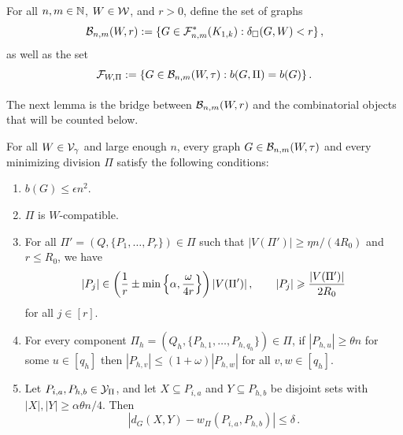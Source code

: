 For all $n,m\in{\mathbb N}$, $W\in{\mathcal W}$, and $r>0$, define the set of graphs
$${\mathcal B}_{n,m}(W,r):=\{G\in{\mathcal F}^\ast_{n,m}(K_{1,k}):\delta_\square(G,W)<r\}\,,$$
as well as the set
\[\arraycolsep=1.4pt
\begin{array}{ll}
\cF_{W,\Pi} &:= \{G\in\cB_{n,m}(W,\tau):b(G,\Pi)=b(G)\}\,. \\[7pt]
\end{array}\]
The next lemma is the bridge between ${\mathcal B}_{n,m}(W,r)$ and the combinatorial objects that will be counted below.

\begin{lemma}\label{lemma:WtoWtildeMetricsK1k}
For all $W\in{\mathcal V}_\gamma$ and large enough $n$, every graph $G\in{\mathcal B}_{n,m}(W,\tau)$ and every minimizing division $\Pi$ satisfy the following conditions:
\begin{enumerate}[
 label=\textit{(\roman*)},
 ref=(\textit{\roman*}),
 topsep=5pt
]
  \item\label{item:bgleqen2} $b(G)\leq \epsilon n^2$.
  \item\label{item:SubCloseK1k-compatible} $\Pi$ is $W$-compatible.
  \item\label{item:SubCloseK1k-balanced} For all $\Pi'=(Q,\{P_1,\dots,P_r\})\in\Pi$ such that $|V(\Pi')|\geq\eta n/(4R_0)$ and $r\leq R_0$, we have
  $$\lvert P_j\rvert\in\left(\frac{1}{r}\pm\min\left\{\alpha,\frac{\omega}{4r}\right\}\right)|V(\Pi')|\,,\qquad |P_j|\geqslant \frac{|V(\Pi')|}{2R_0}$$
  for all $j\in[r]$.
  \item\label{item:SubCloseK1k-theta} For every component $\Pi_h=(Q_h,\{P_{h,1},\dots,P_{h,q_h}\})\in\Pi$, if $|P_{h,u}|\geq\theta n$ for some $u\in[q_h]$ then $|P_{h,v}|\leq(1+\omega)|P_{h,w}|$ for all $v,w\in[q_h]$.
  \item\label{item:SubCloseK1k-cut} Let $P_{i,a},P_{h,b}\in{\mathcal Y}_{\Pi}$, and let $X\subseteq P_{i,a}$ and $Y\subseteq P_{h,b}$ be disjoint sets with $|X|,|Y|\geq \alpha\theta n/4$. Then
  $$\left|d_G(X,Y)-w_{\Pi}(P_{i,a},P_{h,b})\right|\leq\delta\,.$$
\end{enumerate}
\end{lemma}
